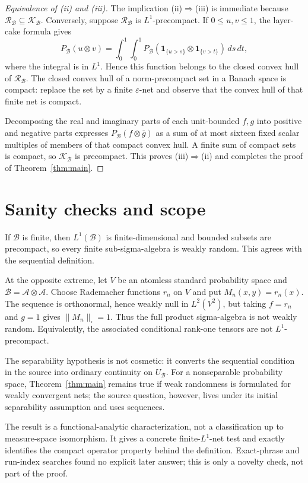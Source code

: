 \documentclass[11pt]{article}
\newcommand{\one}{\mathbf 1}
\newcommand{\cA}{\mathcal A}
\newcommand{\cB}{\mathcal B}
\newcommand{\cK}{\mathcal K}
\newcommand{\cR}{\mathcal R}
\begin{document}
\begin{proof}[Equivalence of \textup{(ii)} and \textup{(iii)}]
The implication (ii)$\Rightarrow$(iii) is immediate because
$\cR_{\cB}\subseteq\cK_{\cB}$.  Conversely, suppose $\cR_{\cB}$ is
$L^1$-precompact.  If $0\leq u,v\leq1$, the layer-cake formula gives
\[
 P_{\cB}(u\otimes v)
 =\int_0^1\!\int_0^1
 P_{\cB}(\one_{\{u>s\}}\otimes\one_{\{v>t\}})\,ds\,dt,
\]
where the integral is in $L^1$.  Hence this function belongs to the closed
convex hull of $\cR_{\cB}$.  The closed convex hull of a norm-precompact set
in a Banach space is compact: replace the set by a finite $\varepsilon$-net
and observe that the convex hull of that finite net is compact.

Decomposing the real and imaginary parts of each unit-bounded $f,g$ into
positive and negative parts expresses $P_{\cB}(f\otimes\overline g)$ as a
sum of at most sixteen fixed scalar multiples of members of that compact
convex hull.  A finite sum of compact sets is compact, so
$\cK_{\cB}$ is precompact.  This proves (iii)$\Rightarrow$(ii) and completes
the proof of Theorem~\ref{thm:main}.
\end{proof}

\small
\section{Sanity checks and scope}

If $\cB$ is finite, then $L^1(\cB)$ is finite-dimensional and bounded
subsets are precompact, so every finite sub-sigma-algebra is weakly random.
This agrees with the sequential definition.

At the opposite extreme, let $V$ be an atomless standard probability space
and $\cB=\cA\otimes\cA$.  Choose Rademacher functions $r_n$ on $V$ and put
$M_n(x,y)=r_n(x)$.  The sequence is orthonormal, hence weakly null in
$L^2(V^2)$, but taking $f=r_n$ and $g=1$ gives
$\|M_n\|_\square=1$.  Thus the full product sigma-algebra is not weakly
random.  Equivalently, the associated conditional rank-one tensors are not
$L^1$-precompact.

The separability hypothesis is not cosmetic: it converts the sequential
condition in the source into ordinary continuity on $U_{\cB}$.  For a
nonseparable probability space, Theorem~\ref{thm:main} remains true if weak
randomness is formulated for weakly convergent nets; the source question,
however, lives under its initial separability assumption and uses sequences.

The result is a functional-analytic characterization, not a classification
up to measure-space isomorphism.  It gives a concrete finite-$L^1$-net test
and exactly identifies the compact operator property behind the definition.
Exact-phrase and run-index searches found no explicit later answer; this is
only a novelty check, not part of the proof.
\end{document}
